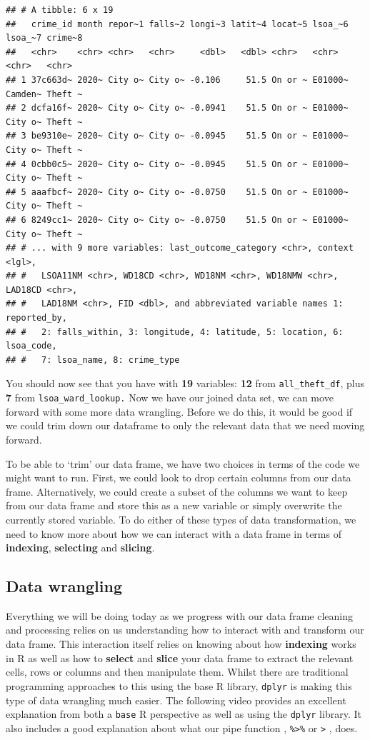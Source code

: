 \documentclass[
]{book}
\begin{document}
\begin{verbatim}
## # A tibble: 6 x 19
##   crime_id month repor~1 falls~2 longi~3 latit~4 locat~5 lsoa_~6 lsoa_~7 crime~8
##   <chr>    <chr> <chr>   <chr>     <dbl>   <dbl> <chr>   <chr>   <chr>   <chr>  
## 1 37c663d~ 2020~ City o~ City o~ -0.106     51.5 On or ~ E01000~ Camden~ Theft ~
## 2 dcfa16f~ 2020~ City o~ City o~ -0.0941    51.5 On or ~ E01000~ City o~ Theft ~
## 3 be9310e~ 2020~ City o~ City o~ -0.0945    51.5 On or ~ E01000~ City o~ Theft ~
## 4 0cbb0c5~ 2020~ City o~ City o~ -0.0945    51.5 On or ~ E01000~ City o~ Theft ~
## 5 aaafbcf~ 2020~ City o~ City o~ -0.0750    51.5 On or ~ E01000~ City o~ Theft ~
## 6 8249cc1~ 2020~ City o~ City o~ -0.0750    51.5 On or ~ E01000~ City o~ Theft ~
## # ... with 9 more variables: last_outcome_category <chr>, context <lgl>,
## #   LSOA11NM <chr>, WD18CD <chr>, WD18NM <chr>, WD18NMW <chr>, LAD18CD <chr>,
## #   LAD18NM <chr>, FID <dbl>, and abbreviated variable names 1: reported_by,
## #   2: falls_within, 3: longitude, 4: latitude, 5: location, 6: lsoa_code,
## #   7: lsoa_name, 8: crime_type
\end{verbatim}

You should now see that you have with \textbf{19} variables: \textbf{12} from \texttt{all\_theft\_df}, plus \textbf{7} from \texttt{lsoa\_ward\_lookup.} Now we have our joined data set, we can move forward with some more data wrangling. Before we do this, it would be good if we could trim down our dataframe to only the relevant data that we need moving forward.

To be able to `trim' our data frame, we have two choices in terms of the code we might want to run. First, we could look to drop certain columns from our data frame. Alternatively, we could create a subset of the columns we want to keep from our data frame and store this as a new variable or simply overwrite the currently stored variable. To do either of these types of data transformation, we need to know more about how we can interact with a data frame in terms of \textbf{indexing}, \textbf{selecting} and \textbf{slicing}.

\hypertarget{data-wrangling}{%
\subsection{Data wrangling}\label{data-wrangling}}

Everything we will be doing today as we progress with our data frame cleaning and processing relies on us understanding how to interact with and transform our data frame. This interaction itself relies on knowing about how \textbf{indexing} works in R as well as how to \textbf{select} and \textbf{slice} your data frame to extract the relevant cells, rows or columns and then manipulate them. Whilst there are traditional programming approaches to this using the base R library, \texttt{dplyr} is making this type of data wrangling much easier. The following video provides an excellent explanation from both a \texttt{base} R perspective as well as using the \texttt{dplyr} library. It also includes a good explanation about what our pipe function , \texttt{\%\textgreater{}\%} or \texttt{\textbar{}\textgreater{}} , does.
\end{document}
